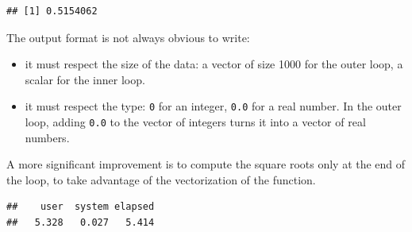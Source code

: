 \documentclass[
  12pt,
  american,
  a4paper,
  extrafontsizes,onecolumn,openright
  ]{memoir}
\newenvironment{Shaded}{\begin{snugshade}}{\end{snugshade}}
\newcommand{\ControlFlowTok}[1]{\textcolor[rgb]{0.13,0.29,0.53}{\textbf{#1}}}
\newcommand{\DecValTok}[1]{\textcolor[rgb]{0.00,0.00,0.81}{#1}}
\newcommand{\FunctionTok}[1]{\textcolor[rgb]{0.00,0.00,0.00}{#1}}
\newcommand{\NormalTok}[1]{#1}
\newcommand{\OtherTok}[1]{\textcolor[rgb]{0.56,0.35,0.01}{#1}}
\newcommand{\SpecialCharTok}[1]{\textcolor[rgb]{0.00,0.00,0.00}{#1}}
\providecommand{\tightlist}{%
  \setlength{\itemsep}{0pt}\setlength{\parskip}{0pt}}
\begin{document}
\begin{verbatim}
## [1] 0.5154062
\end{verbatim}

\normalsize

The output format is not always obvious to write:

\begin{itemize}
\tightlist
\item
  it must respect the size of the data: a vector of size 1000 for the outer loop, a scalar for the inner loop.
\item
  it must respect the type: \texttt{0} for an integer, \texttt{0.0} for a real number. In the outer loop, adding \texttt{0.0} to the vector of integers turns it into a vector of real numbers.
\end{itemize}

A more significant improvement is to compute the square roots only at the end of the loop, to take advantage of the vectorization of the function.

\scriptsize

\begin{Shaded}
\end{Shaded}

\begin{verbatim}
##    user  system elapsed 
##   5.328   0.027   5.414
\end{verbatim}
\end{document}
